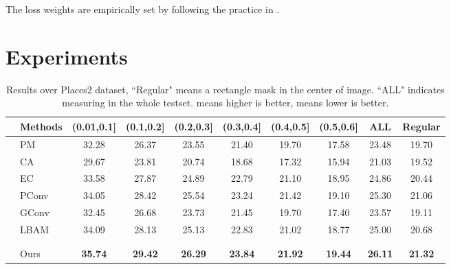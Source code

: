 \documentclass[journal]{IEEEtran}
\begin{document}
The loss weights are empirically set by following the practice in \cite{liu2018image}.





\section{Experiments}
\begin{table*}[!ht]
    \caption{Results over Places2 dataset, ``Regular" means a  rectangle mask in the center of image. ``ALL" indicates measuring in the whole testset.  means higher is better,  means lower is better. }
    \label{tab:comparison_place2}
    \centering
    \begin{tabular}{l|l|ccccccc|c} \hline
         & Methods & (0.01,0.1] & (0.1,0.2]  & (0.2,0.3] & (0.3,0.4]  & (0.4,0.5] & (0.5,0.6]  & ALL & Regular \\ \hline
         \hline
          & PM {\color{black}{\cite{barnes2009patchmatch}}}  & 32.28 & 26.37 & 23.55 & 21.40 & 19.70 & 17.58 & 23.48 & 19.70\\
          & CA {\color{black}{\cite{yu2018generative}}} & 29.67 & 23.81 & 20.74 & 18.68 & 17.32 &15.94 &21.03 & 19.52\\
          & EC {\color{black}{\cite{nazeri2019edgeconnect}}} & 33.58	&27.87	&24.89	&22.79	&21.10	&18.95 & 24.86 &20.44\\
 &  PConv {\color{black}{\cite{liu2018image}}} &34.05&28.42&	25.54&	23.24&	21.42&	19.10& 25.30&21.06\\
          & GConv {\color{black}{\cite{yu2019free}}} & 32.45 & 26.68 & 23.73 & 21.45 & 19.70 & 17.40 & 23.57 & 19.11\\
          &  LBAM {\color{black}{\cite{chaohaoLBAM2019}}} & 34.09&	28.13&	25.13&	22.83&	21.02&	18.77& 25.00&20.68\\
          & {\color{black}{PEN-Net \cite{pennet}}} &{\color{black}{31.61}}& {\color{black}{25.76}} & {\color{black}{23.04}} & {\color{black}{21.07}} & {\color{black}{19.39}} & {\color{black}{18.29}} & {\color{black}{23.19}} & {\color{black}{20.20}} \\
          & {\color{black}{StructureFlow \cite{structureflow}}}&{\color{black}{34.92}} &{\color{black}{29.13}} &{\color{black}{25.89}} &{\color{black}{23.58}} &{\color{black}{21.63}} &{\color{black}{19.35}} &{\color{black}{25.77}} &{\color{black}{21.23}} \\
           &  Ours  & \textbf{35.74}&\textbf{ 29.42}&\textbf{26.29}&\textbf{23.84}&	\textbf{21.92}&	\textbf{19.44}& \textbf{26.11}&\textbf{21.32} \\

\end{tabular}
\end{table*}
\end{document}
